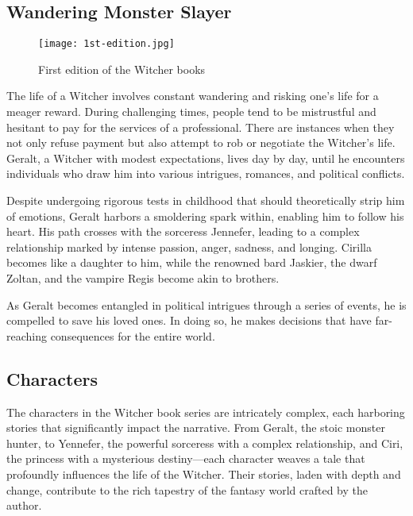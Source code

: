 \documentclass{article}
\begin{document}
\subsection{Wandering Monster Slayer}

\begin{figure}
\centering
\texttt{[image: 1st-edition.jpg]}
\caption{\label{fig:geralt}First edition of the Witcher books}
\end{figure}

The life of a Witcher involves constant wandering and risking one's life for a meager reward. During challenging times, people tend to be mistrustful and hesitant to pay for the services of a professional. There are instances when they not only refuse payment but also attempt to rob or negotiate the Witcher's life. Geralt, a Witcher with modest expectations, lives day by day, until he encounters individuals who draw him into various intrigues, romances, and political conflicts.

Despite undergoing rigorous tests in childhood that should theoretically strip him of emotions, Geralt harbors a smoldering spark within, enabling him to follow his heart. His path crosses with the sorceress Jennefer, leading to a complex relationship marked by intense passion, anger, sadness, and longing. Cirilla becomes like a daughter to him, while the renowned bard Jaskier, the dwarf Zoltan, and the vampire Regis become akin to brothers.

As Geralt becomes entangled in political intrigues through a series of events, he is compelled to save his loved ones. In doing so, he makes decisions that have far-reaching consequences for the entire world.

\subsection{Characters}

The characters in the Witcher book series are intricately complex, each harboring stories that significantly impact the narrative. From Geralt, the stoic monster hunter, to Yennefer, the powerful sorceress with a complex relationship, and Ciri, the princess with a mysterious destiny—each character weaves a tale that profoundly influences the life of the Witcher. Their stories, laden with depth and change, contribute to the rich tapestry of the fantasy world crafted by the author.
\end{document}
